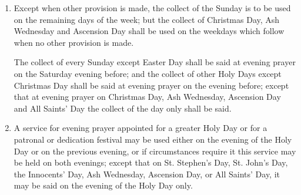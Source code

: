 \begin{enumerate}
\item Except when other provision is made, the collect of the Sunday is to be used on the remaining days of the week; but the collect of Christmas Day, Ash Wednesday and Ascension Day shall be used on the weekdays which follow when no other provision is made.

      The collect of every Sunday except Easter Day shall be said at evening prayer on the Saturday evening before; and the collect of other Holy Days except Christmas Day shall be said at evening prayer on the evening before; except that at evening prayer on Christmas Day, Ash Wednesday, Ascension Day and All Saints' Day the collect of the day only shall be said.

\item A service for evening prayer appointed for a greater Holy Day or for a patronal or dedication festival may be used either on the evening of the Holy Day or on the previous evening, or if circumstances require it this service may be held on both evenings; except that on St. Stephen's Day, St. John's Day, the Innocents' Day, Ash Wednesday, Ascension Day, or All Saints' Day, it may be said on the evening of the Holy Day only.

\end{enumerate}

\clearpage
